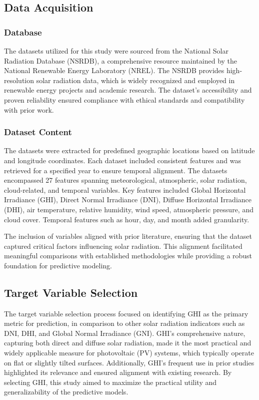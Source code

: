 \documentclass[10pt,twocolumn]{article}
\begin{document}
\begin{itemize}
\subsection{Data Acquisition} 
\subsubsection{Database}
The datasets utilized for this study were sourced from the National Solar Radiation Database (NSRDB), a comprehensive resource maintained by the National Renewable Energy Laboratory (NREL). The NSRDB provides high-resolution solar radiation data, which is widely recognized and employed in renewable energy projects and academic research. The dataset's accessibility and proven reliability ensured compliance with ethical standards and compatibility with prior work.

\subsubsection{Dataset Content}
The datasets were extracted for predefined geographic locations based on latitude and longitude coordinates. Each dataset included consistent features and was retrieved for a specified year to ensure temporal alignment. The datasets encompassed 27 features spanning meteorological, atmospheric, solar radiation, cloud-related, and temporal variables. Key features included Global Horizontal Irradiance (GHI), Direct Normal Irradiance (DNI), Diffuse Horizontal Irradiance (DHI), air temperature, relative humidity, wind speed, atmospheric pressure, and cloud cover. Temporal features such as hour, day, and month added granularity.

The inclusion of variables aligned with prior literature, ensuring that the dataset captured critical factors influencing solar radiation. This alignment facilitated meaningful comparisons with established methodologies while providing a robust foundation for predictive modeling.

\subsection{Target Variable Selection}
The target variable selection process focused on identifying GHI as the primary metric for prediction, in comparison to other solar radiation indicators such as DNI, DHI, and Global Normal Irradiance (GNI). GHI's comprehensive nature, capturing both direct and diffuse solar radiation, made it the most practical and widely applicable measure for photovoltaic (PV) systems, which typically operate on flat or slightly tilted surfaces. Additionally, GHI's frequent use in prior studies highlighted its relevance and ensured alignment with existing research. By selecting GHI, this study aimed to maximize the practical utility and generalizability of the predictive models.


\end{itemize}
\end{document}
